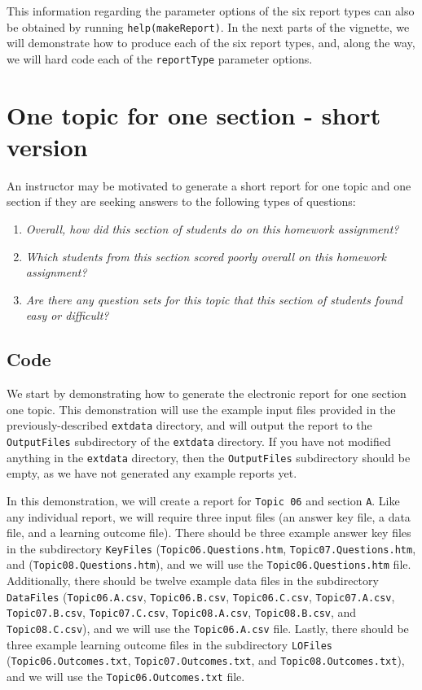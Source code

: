 \documentclass[11pt,a4paper,oldfontcommands,openany]{memoir}
\numberwithin{equation}{section} %
\begin{document}
This information regarding the parameter options of the six report types can also be obtained by running \texttt{help(makeReport)}. In the next parts of the vignette, we will demonstrate how to produce each of the six report types, and, along the way, we will hard code each of the \texttt{reportType} parameter options.

\section{One topic for one section - short version}
\label{sec:oneTopicSectionShort}

An instructor may be motivated to generate a short report for one topic and one section if they are seeking answers to the following types of questions:

\begin{enumerate}
\item \textit{Overall, how did this section of students do on this homework assignment?}
\item \textit{Which students from this section scored poorly overall on this homework assignment?}
\item \textit{Are there any question sets for this topic that this section of students found easy or difficult?}
\end{enumerate}

\subsection{Code}
\label{sec:codeOnce}

We start by demonstrating how to generate the electronic report for one section one topic. This demonstration will use the example input files provided in the previously-described \texttt{extdata} directory, and will output the report to the \texttt{OutputFiles} subdirectory of the \texttt{extdata} directory. If you have not modified anything in the \texttt{extdata} directory, then the \texttt{OutputFiles} subdirectory should be empty, as we have not generated any example reports yet. 

In this demonstration, we will create a report for \texttt{Topic 06} and section \texttt{A}. Like any individual report, we will require three input files (an answer key file, a data file, and a learning outcome file). There should be three example answer key files in the subdirectory \texttt{KeyFiles} (\texttt{Topic06.Questions.htm}, \texttt{Topic07.Questions.htm}, and (\texttt{Topic08.Questions.htm}), and we will use the \texttt{Topic06.Questions.htm} file. Additionally, there should be twelve example data files in the subdirectory \texttt{DataFiles} (\texttt{Topic06.A.csv}, \texttt{Topic06.B.csv}, \texttt{Topic06.C.csv}, \texttt{Topic07.A.csv}, \texttt{Topic07.B.csv}, \texttt{Topic07.C.csv}, \texttt{Topic08.A.csv}, \texttt{Topic08.B.csv}, and \texttt{Topic08.C.csv}), and we will use the \texttt{Topic06.A.csv} file. Lastly, there should be three example learning outcome files in the subdirectory \texttt{LOFiles} (\texttt{Topic06.Outcomes.txt}, \texttt{Topic07.Outcomes.txt}, and \texttt{Topic08.Outcomes.txt}), and we will use the \texttt{Topic06.Outcomes.txt} file.
\end{document}
